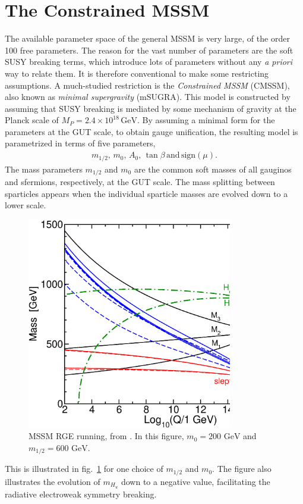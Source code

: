 \documentclass[twoside,english]{uiofysmaster}
\begin{document}
\section{The Constrained MSSM}
The available parameter space of the general MSSM is very large, of the order 100 free parameters. The reason for the vast number of parameters are the soft SUSY breaking terms, which introduce lots of parameters without any {\it a priori} way to relate them. It is therefore conventional to make some restricting assumptions. A much-studied restriction is the {\it Constrained MSSM} (CMSSM), also known as {\it minimal supergravity} (mSUGRA). This model is constructed by assuming that SUSY breaking is mediated by some mechanism of gravity at the Planck scale of $M_P = 2.4\times 10^{18} \, \mathrm{GeV}$. By assuming a minimal form for the parameters at the GUT scale, to obtain gauge unification, the resulting model is parametrized in terms of five parameters,
\begin{align}
	m_{1/2}, \, m_{0}, \, A_0, \, \tan\beta \, \mathrm{and} \, \mathrm{sign}(\mu).
\end{align}
The mass parameters $m_{1/2}$ and $m_0$ are the common soft masses of all gauginos and sfermions, respectively, at the GUT scale. The mass splitting between sparticles appears when the individual sparticle masses are evolved down to a lower scale.
\begin{figure}[hbt]
	\centering
	\includegraphics[width=0.8\textwidth]{figures/susyintro/MSSMrun.eps}
	\caption{MSSM RGE running, from \cite{Martin:1997ns}. In this figure, $m_0 = 200 \,\,\mathrm{GeV}$ and $m_{1/2}= 600 \,\,\mathrm{GeV}$.}
	\label{fig:mssm_rgerun}
\end{figure}
This is illustrated in fig.\ \ref{fig:mssm_rgerun} for one choice of $m_{1/2}$ and $m_0$. The figure also illustrates the evolution of $m_{H_u}$ down to a negative value, facilitating the radiative electroweak symmetry breaking.
\end{document}
